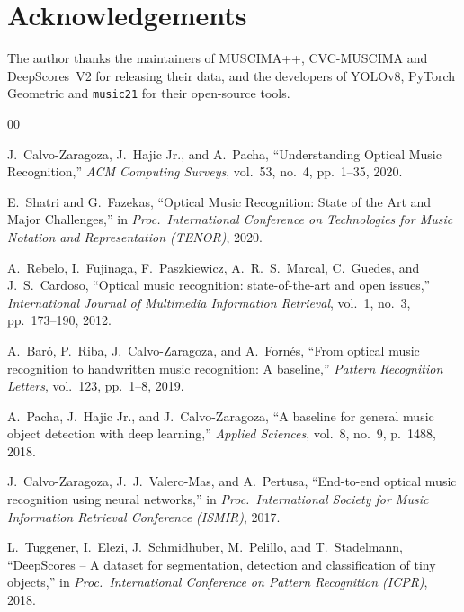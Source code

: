 \documentclass[conference]{IEEEtran}
\begin{document}
\section*{Acknowledgements}
The author thanks the maintainers of MUSCIMA++, CVC-MUSCIMA and DeepScores~V2
for releasing their data, and the developers of YOLOv8, PyTorch Geometric and
\texttt{music21} for their open-source tools.

\begin{thebibliography}{00}

J.~Calvo-Zaragoza, J.~Hajic Jr., and A.~Pacha,
``Understanding Optical Music Recognition,''
\emph{ACM Computing Surveys}, vol.~53, no.~4, pp.~1--35, 2020.

E.~Shatri and G.~Fazekas,
``Optical Music Recognition: State of the Art and Major Challenges,''
in \emph{Proc.\ International Conference on Technologies for Music Notation
and Representation (TENOR)}, 2020.

A.~Rebelo, I.~Fujinaga, F.~Paszkiewicz, A.~R.~S.~Marcal, C.~Guedes, and
J.~S.~Cardoso,
``Optical music recognition: state-of-the-art and open issues,''
\emph{International Journal of Multimedia Information Retrieval},
vol.~1, no.~3, pp.~173--190, 2012.

A.~Bar\'o, P.~Riba, J.~Calvo-Zaragoza, and A.~Forn\'es,
``From optical music recognition to handwritten music recognition: A baseline,''
\emph{Pattern Recognition Letters}, vol.~123, pp.~1--8, 2019.

A.~Pacha, J.~Hajic Jr., and J.~Calvo-Zaragoza,
``A baseline for general music object detection with deep learning,''
\emph{Applied Sciences}, vol.~8, no.~9, p.~1488, 2018.

J.~Calvo-Zaragoza, J.~J.~Valero-Mas, and A.~Pertusa,
``End-to-end optical music recognition using neural networks,''
in \emph{Proc.\ International Society for Music Information Retrieval
Conference (ISMIR)}, 2017.

L.~Tuggener, I.~Elezi, J.~Schmidhuber, M.~Pelillo, and T.~Stadelmann,
``DeepScores -- A dataset for segmentation, detection and classification of
tiny objects,''
in \emph{Proc.\ International Conference on Pattern Recognition (ICPR)}, 2018.


\end{thebibliography}
\end{document}
